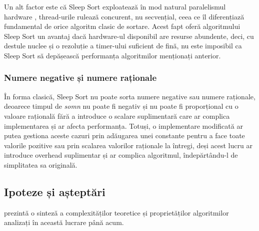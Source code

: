 \documentclass[9pt,a4paper,twocolumn,twoside]{rho-class/rho}
\begin{document}
\par Un alt factor este că Sleep Sort exploatează în mod natural paralelismul hardware 
\cite{tanenbaum2014modern}, thread-urile rulează concurent, 
nu secvențial, ceea ce îl diferențiază fundamental de orice 
algoritm clasic de sortare. 
Acest fapt oferă algoritmului Sleep Sort un avantaj dacă hardware-ul disponibil are resurse abundente, deci, cu destule nuclee și o rezoluție a timer-ului suficient de fină, nu este imposibil ca Sleep Sort să depășească performanța algoritmilor menționați anterior.


\subsubsection{Numere negative și numere raționale}

În forma clasică, Sleep Sort nu poate sorta numere negative sau numere raționale, deoarece timpul de \textit{somn} nu poate fi negativ și nu poate fi proporțional cu o valoare rațională fără a introduce o scalare suplimentară care ar complica implementarea și ar afecta performanța.
Totuși, o implementare modificată ar putea gestiona aceste cazuri prin adăugarea unei constante pentru a face toate valorile pozitive sau prin scalarea valorilor raționale la întregi, deși acest lucru ar introduce overhead suplimentar și ar complica algoritmul, îndepărtându-l de simplitatea sa originală.

\subsection{Ipoteze și așteptări}
    \label{sec:ipoteze}
 prezintă o sinteză a complexităților 
teoretice și proprietăților algoritmilor analizați în această lucrare până acum.
\end{document}
